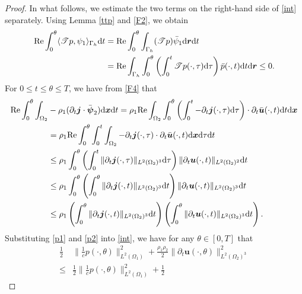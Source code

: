 \documentclass[final,leqno]{siamltex}
\begin{document}
\begin{proof}
In what follows, we estimate the two terms on the right-hand side of \eqref{int}
separately. Using Lemma \ref{ttp} and \eqref{F2}, we obtain
\begin{align}
 {\rm Re} \int_0^{\theta} \langle \mathscr T p, \psi_1 \rangle_{\Gamma_h} {\rm d
}t &= {\rm Re}\int_0^{\theta}\int_{\Gamma_h} (\mathscr T p) \bar {\psi}_1 {\rm
d}\boldsymbol r {\rm d} t \nonumber\\
 &={\rm Re} \int_{\Gamma_h}\int_0^{\theta} \left( \int_0^t \mathscr T p (\cdot,
\tau) {\rm d} \tau \right) \bar p (\cdot, t) {\rm d} t{\rm d}\boldsymbol r
\leq 0.\label{p1}
\end{align}
For $0 \leq t \leq \theta \leq T$, we have from \eqref{F4} that
\begin{align}
 {\rm Re}\int_0^{\theta} \int_{\Omega_2}& -\rho_1(\partial_t \boldsymbol j \cdot
\bar {\boldsymbol \psi}_2) {\rm d} \boldsymbol x  {\rm d}t
 = {\rho_1}{\rm Re}\int_{\Omega_2} \int_0^{\theta} \left( \int_0^t- \partial_t
\boldsymbol j (\cdot, \tau) {\rm d} \tau \right) \cdot
 \partial_t \bar {\boldsymbol u}  (\cdot, t) {\rm d}t {\rm d} \boldsymbol x
\nonumber\\
 &= \rho_1 {\rm Re}\int_0^{\theta} \int_0^t \int_{\Omega_2} - \partial_t
\boldsymbol j (\cdot, \tau) \cdot \partial_t \bar {\boldsymbol u} (\cdot, t)
{\rm d} \boldsymbol x {\rm d}\tau {\rm d} t \nonumber\\
 &\leq \rho_1 \int_0^{\theta} \left( \int_0^{t} \|\partial_t  \boldsymbol j
(\cdot, \tau)\|_{L^2 (\Omega_2)^3} {\rm d }\tau\right)
 \| \partial_t  \boldsymbol u (\cdot, t)\|_{L^2 (\Omega_2)^2} {\rm d} t
\nonumber\\
 &\leq \rho_1 \int_0^{\theta} \left( \int_0^{\theta} \|\partial_t  \boldsymbol j
(\cdot, t)\|_{L^2 (\Omega_2)^3} {\rm d }t\right)
 \| \partial_t  \boldsymbol u (\cdot, t)\|_{L^2 (\Omega_2)^3} {\rm d} t
\nonumber\\
 &\leq \rho_1 \left( \int_0^{\theta} \|\partial_t  \boldsymbol j (\cdot,
t)\|_{L^2(\Omega_2)^3} {\rm d }t\right)
 \left( \int_0^{\theta} \|\partial_t  \boldsymbol u (\cdot, t)\|_{L^2
(\Omega_2)^3} {\rm d }t\right). \label{p2}
\end{align}
Substituting \eqref{p1} and \eqref{p2} into \eqref{int}, we have for any $\theta\in [0,T]$ that
\begin{align}
 \frac{1}{2}&\|\frac{1}{c} p (\cdot, \theta)\|^2_{L^2 (\Omega_1)}
 + \frac{\rho_1 \rho_2}{2}\| \partial_t\boldsymbol u (\cdot, \theta)\|^2_{L^2
(\Omega_2)^3} \nonumber\\
 \leq &\frac{1}{2}
 \|\frac{1}{c} p (\cdot, \theta)\|^2_{L^2 (\Omega_1)} +\frac{1}{2}

\end{align}
\end{proof}
\end{document}
